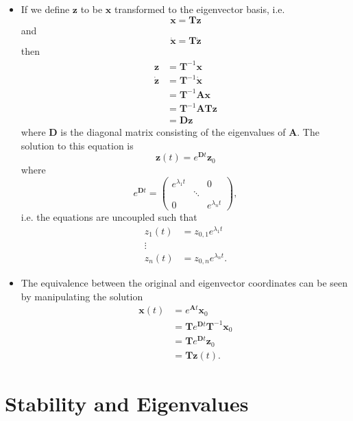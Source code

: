 \documentclass{article}
\renewcommand{\vec}[1]{\boldsymbol{\mathbf{#1}}}
\newcommand{\dvec}[1]{\dot{\vec{#1}}}
\begin{document}
\begin{itemize}
  \item If we define $\vec{z}$ to be $\vec{x}$ transformed to the eigenvector basis, i.e. \[\vec{x} = \vec{T} \vec{z}\] and \[\dvec{x} = \vec{T} \dvec{z}\] then \begin{align*}
          \vec{z}  & = \vec{T}^{-1} \vec{x}                 \\
          \dvec{z} & = \vec{T}^{-1} \dvec{x}                \\
                   & = \vec{T}^{-1} \vec{A} \vec{x}         \\
                   & = \vec{T}^{-1} \vec{A} \vec{T} \vec{z} \\
                   & = \vec{D} \vec{z}
        \end{align*} where $\vec{D}$ is the diagonal matrix consisting of the eigenvalues of $\vec{A}$. The solution to this equation is \[\vec{z}(t) = e^{\vec{D} t} \vec{z}_0\] where \[e^{\vec{D} t} = \begin{pmatrix}
            e^{\lambda_1 t} &        & 0               \\
                            & \ddots &                 \\
            0               &        & e^{\lambda_n t}
          \end{pmatrix},\] i.e. the equations are uncoupled such that \begin{align*}
          z_1(t) & = z_{0,1} e^{\lambda_1 t}  \\
          \vdots                              \\
          z_n(t) & = z_{0,n} e^{\lambda_n t}.
        \end{align*}

  \item The equivalence between the original and eigenvector coordinates can be seen by manipulating the solution \begin{align*}
          \vec{x}(t) & = e^{\vec{A} t} \vec{x}_0                      \\
                     & = \vec{T} e^{\vec{D} t} \vec{T}^{-1} \vec{x}_0 \\
                     & = \vec{T} e^{\vec{D} t} \vec{z}_0              \\
                     & = \vec{T} \vec{z}(t).
        \end{align*}
\end{itemize}

\section{Stability and Eigenvalues}
\end{document}

